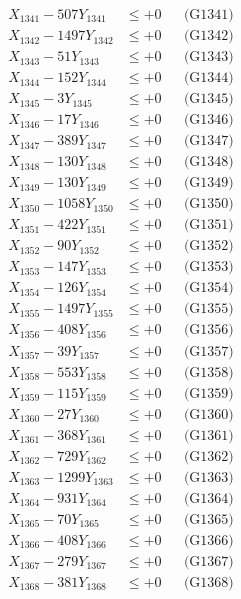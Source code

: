 \documentclass[a4paper,10pt]{article}
\begin{document}
{\begin{align}
\allowbreak
X_{1341} - 507Y_{1341} &\leq +0 && \text{(G1341)} \\
X_{1342} - 1497Y_{1342} &\leq +0 && \text{(G1342)} \\
X_{1343} - 51Y_{1343} &\leq +0 && \text{(G1343)} \\
X_{1344} - 152Y_{1344} &\leq +0 && \text{(G1344)} \\
X_{1345} - 3Y_{1345} &\leq +0 && \text{(G1345)} \\
X_{1346} - 17Y_{1346} &\leq +0 && \text{(G1346)} \\
X_{1347} - 389Y_{1347} &\leq +0 && \text{(G1347)} \\
X_{1348} - 130Y_{1348} &\leq +0 && \text{(G1348)} \\
X_{1349} - 130Y_{1349} &\leq +0 && \text{(G1349)} \\
X_{1350} - 1058Y_{1350} &\leq +0 && \text{(G1350)} \\
\allowbreak
X_{1351} - 422Y_{1351} &\leq +0 && \text{(G1351)} \\
X_{1352} - 90Y_{1352} &\leq +0 && \text{(G1352)} \\
X_{1353} - 147Y_{1353} &\leq +0 && \text{(G1353)} \\
X_{1354} - 126Y_{1354} &\leq +0 && \text{(G1354)} \\
X_{1355} - 1497Y_{1355} &\leq +0 && \text{(G1355)} \\
X_{1356} - 408Y_{1356} &\leq +0 && \text{(G1356)} \\
X_{1357} - 39Y_{1357} &\leq +0 && \text{(G1357)} \\
X_{1358} - 553Y_{1358} &\leq +0 && \text{(G1358)} \\
X_{1359} - 115Y_{1359} &\leq +0 && \text{(G1359)} \\
X_{1360} - 27Y_{1360} &\leq +0 && \text{(G1360)} \\
\allowbreak
X_{1361} - 368Y_{1361} &\leq +0 && \text{(G1361)} \\
X_{1362} - 729Y_{1362} &\leq +0 && \text{(G1362)} \\
X_{1363} - 1299Y_{1363} &\leq +0 && \text{(G1363)} \\
X_{1364} - 931Y_{1364} &\leq +0 && \text{(G1364)} \\
X_{1365} - 70Y_{1365} &\leq +0 && \text{(G1365)} \\
X_{1366} - 408Y_{1366} &\leq +0 && \text{(G1366)} \\
X_{1367} - 279Y_{1367} &\leq +0 && \text{(G1367)} \\
X_{1368} - 381Y_{1368} &\leq +0 && \text{(G1368)} \\

\end{align}}
\end{document}
